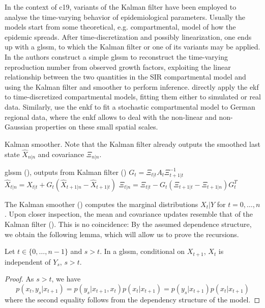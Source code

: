 In the context of \acrshort{c19}, variants of the Kalman filter have been employed to analyse the time-varying behavior of epidemiological parameters. Usually the models start from some theoretical, e.g. compartmental, model of how the epidemic spreads. After time-discretization and possibly linearization, one ends up with a \acrshort{glssm}, to which the Kalman filter or one of its variants may be applied. 
In \citep{Arroyo-Marioli2021Tracking} the authors construct a simple \acrshort{glssm} to reconstruct the time-varying reproduction number from observed growth factors, exploiting the linear relationship between the two quantities in the SIR compartmental model and using the Kalman filter and smoother to perform inference. 
\citep{Zhu2021Extended,Song2021Maximum} directly apply the \acrshort{ekf} to time-discretized compartmental models, fitting them either to simulated \citep{Zhu2021Extended} or real \citep{Song2021Maximum} data. Similarly, \citep{Engbert2020Sequential} use the \acrshort{enkf} to fit a stochastic compartmental model to German regional data, where the \acrshort{enkf} allows to deal with the non-linear and non-Gaussian properties on these small spatial scales.

\begin{algorithm}
    \caption{Kalman smoother. Note that the Kalman filter already outputs the smoothed last state $\hat X_{n|n}$ and covariance $\Xi_{n|n}$.}
    \label{alg:kalman_smoother}
    \begin{algorithmic}[1]
        \Require \acrshort{glssm} (), outputs from Kalman filter ()
            \State $G_{t} = \Xi_{t|t} A_{t}\Xi_{t+1|t}^{-1}$
            \State $\hat X_{t | n} = \hat X_{t|t} + G_{t} \left( \hat X_{t + 1|n} - \hat X_{t + 1|t} \right)$
            \State $\Xi_{t|n} = \Xi_{t|t} - G_{t} \left( \Xi_{t + 1|t} - \Xi_{t + 1|n} \right)G_{t}^T$
        \EndFor
    \end{algorithmic}
\end{algorithm}

The Kalman smoother () computes the marginal distributions $X_{t} | Y$ for $t = 0, \dots, n$. Upon closer inspection, the mean and covariance updates resemble that of the Kalman filter (). This is no coincidence: By the assumed dependence structure, we obtain the following lemma, which will allow us to prove the recursions.
\begin{lemma}
    Let $t \in \{0, \dots, n - 1\}$ and $s > t$. In a \acrshort{glssm}, conditional on $X_{t + 1}$, $X_{t}$ is independent of $Y_{s}$, $s > t$. 
\end{lemma}
\begin{proof}
    As $s > t$, we have
    $$
    p(x_{t}, y_{s} | x_{t + 1}) = p(y_{s}| x_{t + 1}, x_{t}) p(x_{t} | x_{t + 1}) = p(y_{s} | x_{t + 1}) p(x_{t} | x_{t + 1})
    $$
    where the second equality follows from the dependency structure of the model. 
\end{proof}

